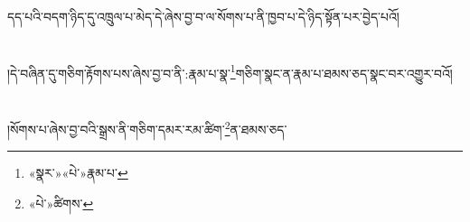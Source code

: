 དད་པའི་བདག་ཉིད་དུ་འཁྲུལ་པ་མེད་དེ་ཞེས་བྱ་བ་ལ་སོགས་པ་ནི་ཁྱབ་པ་དེ་ཉིད་སྟོན་པར་བྱེད་པའོ།\chapter{ }།དེ་བཞིན་དུ་གཅིག་རྟོགས་པས་ཞེས་བྱ་བ་ནི་:རྣམ་པ་སྣ་\footnote{«སྣར་»«པེ་»རྣམ་པ་}གཅིག་སྣང་ན་རྣམ་པ་ཐམས་ཅད་སྣང་བར་འགྱུར་བའོ།\chapter{ }།སོགས་པ་ཞེས་བྱ་བའི་སྒྲས་ནི་གཅིག་དམར་རམ་ཚིག་\footnote{«པེ་»ཚིགས་}ན་ཐམས་ཅད་